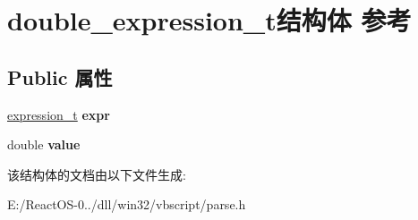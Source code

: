 \hypertarget{structdouble__expression__t}{}\section{double\+\_\+expression\+\_\+t结构体 参考}
\label{structdouble__expression__t}
\subsection*{Public 属性}
\begin{DoxyCompactItemize}
\item 
\mbox{\label{structdouble__expression__t_a20af52fc4ef5c537afca7db0203f625f}} 
\hyperlink{struct__expression__t}{expression\+\_\+t} {\bfseries expr}
\item 
\mbox{\label{structdouble__expression__t_a2a2a8e1c415d9caa9ef3e40e296fae68}} 
double {\bfseries value}
\end{DoxyCompactItemize}


该结构体的文档由以下文件生成\+:\begin{DoxyCompactItemize}
\item 
E\+:/\+React\+O\+S-\/0../dll/win32/vbscript/parse.\+h\end{DoxyCompactItemize}
